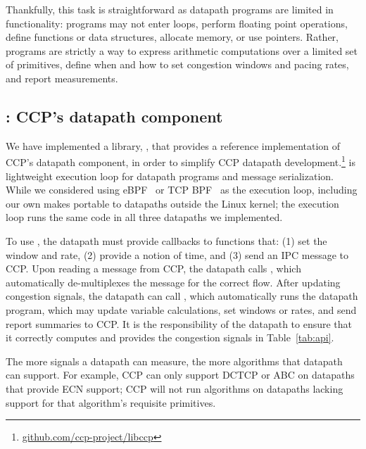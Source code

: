 Thankfully, this task is straightforward as datapath programs are limited in functionality: 
programs may not enter loops, perform floating point operations, define functions or data structures, allocate memory, or use pointers. Rather, programs are strictly a way to express arithmetic computations over a limited set of primitives, define when and how to set congestion windows and pacing rates, and report measurements.

\subsection{: CCP's datapath component}
\label{s:datapath:libccp}
We have implemented a library, , that provides a reference
implementation of CCP's datapath component, in order to simplify CCP datapath development.\footnote{\url{github.com/ccp-project/libccp}}
 is lightweight execution loop for
datapath programs and message serialization. 
While we considered using eBPF~\cite{ebpf} or TCP BPF~\cite{tcpbpf}
as the execution loop, including our own makes  portable to datapaths outside the Linux kernel; the execution loop runs the same code in all three datapaths we implemented.

To use , the datapath must provide callbacks to functions that: (1) set the window and rate, (2) provide a notion of time, and (3) send an IPC message to CCP. Upon reading a message from CCP, the datapath calls , which automatically de-multiplexes the message for the correct flow. After updating congestion signals, the datapath can call , which automatically runs the datapath program, which may update variable calculations, set windows or rates,
and send report summaries to CCP. It is the responsibility of the datapath to ensure that it correctly computes and provides the congestion signals in Table~\ref{tab:api}.

The more signals a datapath can measure, the more algorithms that datapath can support. For example, CCP can only support DCTCP \cite{DCTCP} or ABC \cite{abc} on datapaths that provide ECN support; CCP will not run algorithms on datapaths lacking support for that algorithm’s requisite primitives.


